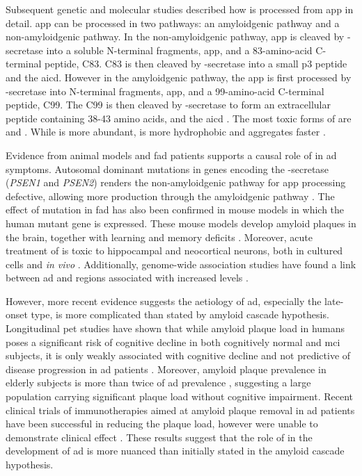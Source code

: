 Subsequent genetic and molecular studies described how \abeta{} is processed from \gls{app} in detail. \Gls{app} can be processed in two pathways: an amyloidgenic pathway and a non-amyloidgenic pathway. In the non-amyloidgenic pathway, \gls{app} is cleaved by \textalpha-secretase into a soluble N-terminal fragments, \gls{app}\textalpha, and a 83-amino-acid C-terminal peptide, C83. C83 is then cleaved by \textgamma-secretase into a small p3 peptide and the \gls{aicd}. However in the amyloidgenic pathway, the \gls{app} is first processed by \textbeta-secretase into N-terminal fragments, \gls{app}\textbeta, and a 99-amino-acid C-terminal peptide, C99. The C99 is then cleaved by \textgamma-secretase to form an extracellular peptide containing 38-43 amino acids, \abeta{} and the \gls{aicd} \citep{barage15}. The most toxic forms of \abeta{} are \abeta[40] and \abeta[42]. While \abeta[40] is more abundant, \abeta[42] is more hydrophobic and aggregates faster \citep{walsh07}. 

Evidence from animal models and \gls{fad} patients supports a causal role of \abeta{} in \gls{ad} symptoms. Autosomal dominant mutations in genes encoding the \textgamma-secretase (\textit{PSEN1} and \textit{PSEN2}) renders the non-amyloidgenic pathway for \gls{app} processing defective, allowing more \abeta{} production through the amyloidgenic pathway \citep{suzuki94, levy-lahad95, rogaev95}. The effect of mutation in \gls{fad} has also been confirmed in mouse models in which the human mutant gene is expressed. These mouse models develop amyloid plaques in the brain, together with learning and memory deficits \citep{hsiao96, dodart99, chishti01, westerman02}. Moreover, acute treatment of \abeta{} is toxic to hippocampal and neocortical neurons, both in cultured cells and \textit{in vivo} \citep{lacor04, shankar08}. Additionally, genome-wide association studies have found a link between \gls{ad} and regions associated with increased \abeta{} levels \citep{kehoe99, myers00}.

However, more recent evidence suggests the aetiology of \gls{ad}, especially the late-onset type, is more complicated than stated by amyloid cascade hypothesis. Longitudinal \gls{pet} studies have shown that while amyloid plaque load in humans poses a significant risk of cognitive decline in both cognitively normal and \gls{mci} subjects, it is only weakly associated with cognitive decline and not predictive of disease progression in \gls{ad} patients \citep{chen14}. Moreover, amyloid plaque prevalence in elderly subjects is more than twice of \gls{ad} prevalence \citep{rowe10, ad16}, suggesting a large population carrying significant plaque load without cognitive impairment. Recent clinical trials of immunotherapies aimed at amyloid plaque removal in \gls{ad} patients have been successful in reducing the plaque load, however were unable to demonstrate clinical effect \citep{farlow15, siemers16, sevigny16}. These results suggest that the role of \abeta{} in the development of \gls{ad} is more nuanced than initially stated in the amyloid cascade hypothesis. 

